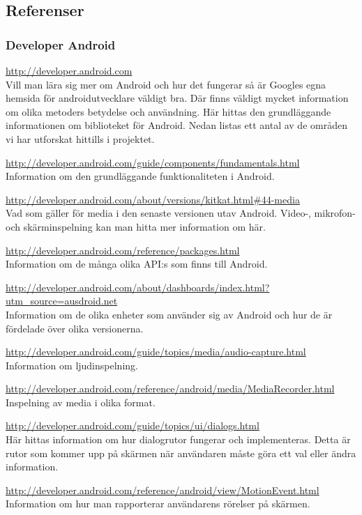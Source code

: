\subsection{Referenser}

\subsubsection{Developer Android}
\url{http://developer.android.com} \\
Vill man lära sig mer om Android och hur det fungerar så är Googles egna hemsida för androidutvecklare väldigt bra. Där finns väldigt mycket information om olika metoders betydelse och användning. Här hittas den grundläggande informationen om biblioteket för Android. Nedan listas ett antal av de områden vi har utforskat hittills i projektet.

\url{http://developer.android.com/guide/components/fundamentals.html} \\
Information om den grundläggande funktionaliteten i Android.

\url{http://developer.android.com/about/versions/kitkat.html#44-media} \\
Vad som gäller för media i den senaste versionen utav Android. Video-, mikrofon- och skärminspelning kan man hitta mer information om här.

\url{http://developer.android.com/reference/packages.html} \\
Information om de många olika API:s som finns till Android.

\url{http://developer.android.com/about/dashboards/index.html?utm_source=ausdroid.net} \\
Information om de olika enheter som använder sig av Android och hur de är fördelade över olika versionerna.

\url{http://developer.android.com/guide/topics/media/audio-capture.html} \\
Information om ljudinspelning.

\url{http://developer.android.com/reference/android/media/MediaRecorder.html} \\
Inspelning av media i olika format.

\url{http://developer.android.com/guide/topics/ui/dialogs.html} \\
Här hittas information om hur dialogrutor fungerar och implementeras. Detta är rutor som kommer upp på skärmen när användaren måste göra ett val eller ändra information.

\url{http://developer.android.com/reference/android/view/MotionEvent.html} \\
Information om hur man rapporterar användarens rörelser på skärmen.

